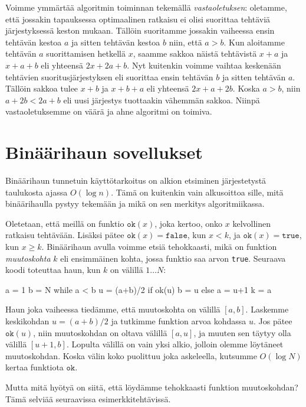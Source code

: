 Voimme ymmärtää algoritmin toiminnan tekemällä \emph{vastaoletuksen}:
oletamme, että jossakin tapauksessa optimaalinen ratkaisu
ei olisi suorittaa tehtäviä järjestyksessä keston mukaan.
Tällöin suoritamme jossakin vaiheessa ensin tehtävän kestoa $a$
ja sitten tehtävän kestoa $b$ niin, että $a>b$.
Kun aloitamme tehtävän $a$ suorittamisen hetkellä $x$,
saamme sakkoa näistä tehtävistä $x+a$ ja $x+a+b$ eli yhteensä $2x+2a+b$.
Nyt kuitenkin voimme vaihtaa keskenään tehtävien suoritusjärjestyksen
eli suorittaa ensin tehtävän $b$ ja sitten tehtävän $a$.
Tällöin sakkoa tulee $x+b$ ja $x+b+a$ eli yhteensä $2x+a+2b$.
Koska $a>b$, niin $a+2b < 2a+b$ eli uusi järjestys tuottaakin
vähemmän sakkoa.
Niinpä vastaoletuksemme on väärä ja ahne algoritmi on toimiva.

\section{Binäärihaun sovellukset}

Binäärihaun tunnetuin käyttötarkoitus on alkion etsiminen
järjestetystä taulukosta ajassa $O(\log n)$.
Tämä on kuitenkin vain alkusoittoa sille,
mitä binää\-rihaulla pystyy tekemään ja mikä on sen
merkitys algoritmiikassa.

Oletetaan, että meillä on funktio $\texttt{ok}(x)$,
joka kertoo, onko $x$ kelvollinen ratkaisu tehtävään.
Lisäksi pätee $\texttt{ok}(x)=\texttt{false}$, kun $x<k$,
ja $\texttt{ok}(x)=\texttt{true}$, kun $x \ge k$.
Binäärihaun avulla voimme etsiä tehokkaasti,
mikä on funktion \emph{muutoskohta} $k$
eli ensimmäinen kohta, jossa funktio saa arvon \texttt{true}.
Seuraava koodi toteuttaa haun,
kun $k$ on välillä $1 \dots N$:


\begin{code}
a = 1
b = N
while a < b
    u = (a+b)/2
    if ok(u)
        b = u
    else
        a = u+1
k = a
\end{code}

Haun joka vaiheessa tiedämme, että muutoskohta on välillä $[a,b]$.
Laskemme keskikohdan $u=(a+b)/2$ ja tutkimme funktion arvoa kohdassa $u$.
Jos pätee $\texttt{ok}(u)$, niin muutoskohdan on oltava välillä $[a,u]$,
ja muuten sen täytyy olla välillä $[u+1,b]$.
Lopulta välillä on vain yksi alkio, jolloin olemme löytäneet muutoskohdan.
Koska välin koko puolittuu joka askeleella,
kutsumme $O(\log N)$ kertaa funktiota $\texttt{ok}$.

Mutta mitä hyötyä on siitä, että löydämme tehokkaasti funktion muutoskohdan?
Tämä selviää seuraavissa esimerkkitehtävissä.

